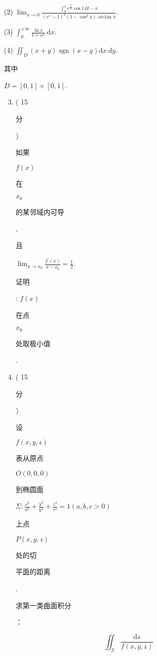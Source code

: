 \documentclass[10pt]{article}
\begin{document}
(2) $\lim _{x \rightarrow 0} \frac{\int_{0}^{x} e^{\frac{t^{2}}{2}} \cos t \mathrm{~d} t-x}{\left(e^{x}-1\right)^{2}\left(1-\cos ^{2} x\right) \arctan x}$.

(3) $\int_{0}^{+\infty} \frac{\ln x}{1+x^{2}} \mathrm{~d} x$.

(4) $\iint_{D}(x+y) \operatorname{sgn}(x-y) \mathrm{d} x \mathrm{~d} y$. \begin{CJK}{UTF8}{mj}其中\end{CJK} $D=[0,1] \times[0,1]$.

\begin{enumerate}
  \setcounter{enumi}{2}
  \item ( 15 \begin{CJK}{UTF8}{mj}分\end{CJK}) \begin{CJK}{UTF8}{mj}如果\end{CJK} $f(x)$ \begin{CJK}{UTF8}{mj}在\end{CJK} $x_{0}$ \begin{CJK}{UTF8}{mj}的某邻域内可导\end{CJK}, \begin{CJK}{UTF8}{mj}且\end{CJK} $\lim _{x \rightarrow x_{0}} \frac{f^{\prime}(x)}{x-x_{0}}=\frac{1}{2}$. \begin{CJK}{UTF8}{mj}证明\end{CJK}: $f(x)$ \begin{CJK}{UTF8}{mj}在点\end{CJK} $x_{0}$ \begin{CJK}{UTF8}{mj}处取极小值\end{CJK}.

  \item ( 15 \begin{CJK}{UTF8}{mj}分\end{CJK}) \begin{CJK}{UTF8}{mj}设\end{CJK} $f(x, y, z)$ \begin{CJK}{UTF8}{mj}表从原点\end{CJK} $O(0,0,0)$ \begin{CJK}{UTF8}{mj}到椭圆面\end{CJK} $\Sigma: \frac{x^{2}}{a^{2}}+\frac{y^{2}}{b^{2}}+\frac{z^{2}}{c^{2}}=1(a, b, c>0)$ \begin{CJK}{UTF8}{mj}上点\end{CJK} $P(x, y, z)$ \begin{CJK}{UTF8}{mj}处的切\end{CJK} \begin{CJK}{UTF8}{mj}平面的距离\end{CJK}. \begin{CJK}{UTF8}{mj}求第一类曲面积分\end{CJK}：

\end{enumerate}
$$
\iint_{\Sigma} \frac{\mathrm{d} s}{f(x, y, z)}
$$
\end{document}

